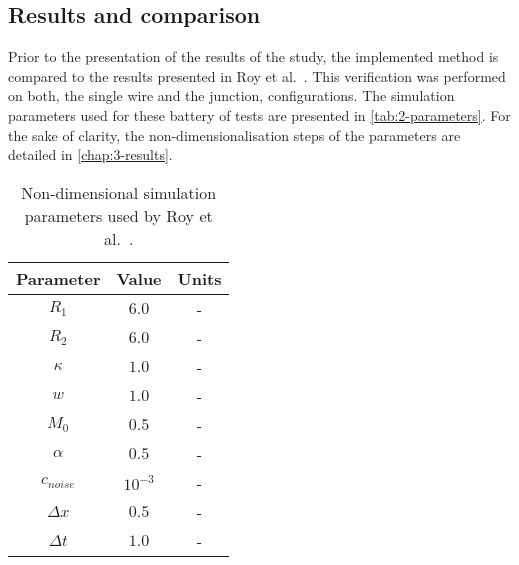     \subsection{Results and comparison}
    Prior to the presentation of the results of the study, the implemented method is compared to the results presented in Roy et al.~\cite{RoyVarmaGururajan2021}. This verification was performed on both, the single wire and the junction, configurations. The simulation parameters used for these battery of tests are presented in \autoref{tab:2-parameters}. For the sake of clarity, the non-dimensionalisation steps of the parameters are detailed in \autoref{chap:3-results}.
    \begin{table}[H]
        \centering
        \begin{tabular}{ccc}
            \hline
            Parameter & Value & Units\\
            \hline
            $R_1$ & $6.0$ & -\\
            $R_2$ & $6.0$ & -\\
            $\kappa$ & $1.0$ & -\\
            $w$ & $1.0$ & - \\
            $M_0$ & $0.5$ & - \\
            $\alpha$ & $0.5$ & -\\
            $c_{noise}$ & $10^{-3}$ & -\\
            $\Delta x$ & $0.5$ & -\\
            $\Delta t$ & $1.0$ & -\\
            \hline
        \end{tabular}
        \caption{Non-dimensional simulation parameters used by Roy et al.~\cite{RoyVarmaGururajan2021}.}
        \label{tab:2-parameters}
    \end{table}
